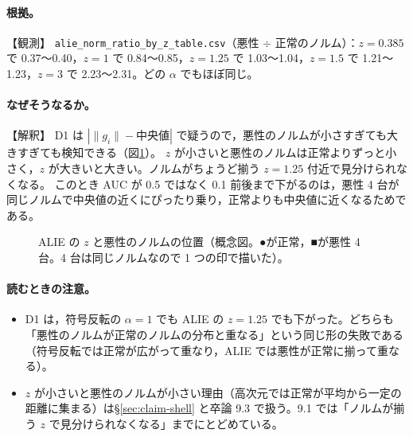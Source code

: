 \documentclass[a4j, dvipdfmx]{jsarticle}  %
\begin{document}
\paragraph{根拠。}【観測】
\texttt{alie\_norm\_ratio\_by\_z\_table.csv}（悪性 $\div$ 正常のノルム）：$z = 0.385$ で 0.37〜0.40，$z = 1$ で 0.84〜0.85，$z = 1.25$ で 1.03〜1.04，$z = 1.5$ で 1.21〜1.23，$z = 3$ で 2.23〜2.31。どの $\alpha$ でもほぼ同じ。

\paragraph{なぜそうなるか。}【解釈】
D1 は $|\|g_i\| - \text{中央値}|$ で疑うので，悪性のノルムが小さすぎても大きすぎても検知できる（図\ref{fig:alie-d1}）。
$z$ が小さいと悪性のノルムは正常よりずっと小さく，$z$ が大きいと大きい。ノルムがちょうど揃う $z = 1.25$ 付近で見分けられなくなる。
このとき AUC が 0.5 ではなく 0.1 前後まで下がるのは，悪性 4 台が同じノルムで中央値の近くにぴったり乗り，正常よりも中央値に近くなるためである。

\begin{figure}[H]
\centering
{}
\caption{ALIE の $z$ と悪性のノルムの位置（概念図。●が正常，■が悪性 4 台。4 台は同じノルムなので 1 つの印で描いた）。}
\label{fig:alie-d1}
\end{figure}

\paragraph{読むときの注意。}
\begin{itemize}
  \item D1 は，符号反転の $\alpha = 1$ でも ALIE の $z = 1.25$ でも下がった。どちらも「悪性のノルムが正常のノルムの分布と重なる」という同じ形の失敗である（符号反転では正常が広がって重なり，ALIE では悪性が正常に揃って重なる）。
  \item $z$ が小さいと悪性のノルムが小さい理由（高次元では正常が平均から一定の距離に集まる）は\S\ref{sec:claim-shell} と卒論 9.3 で扱う。9.1 では「ノルムが揃う $z$ で見分けられなくなる」までにとどめている。
\end{itemize}
\end{document}
